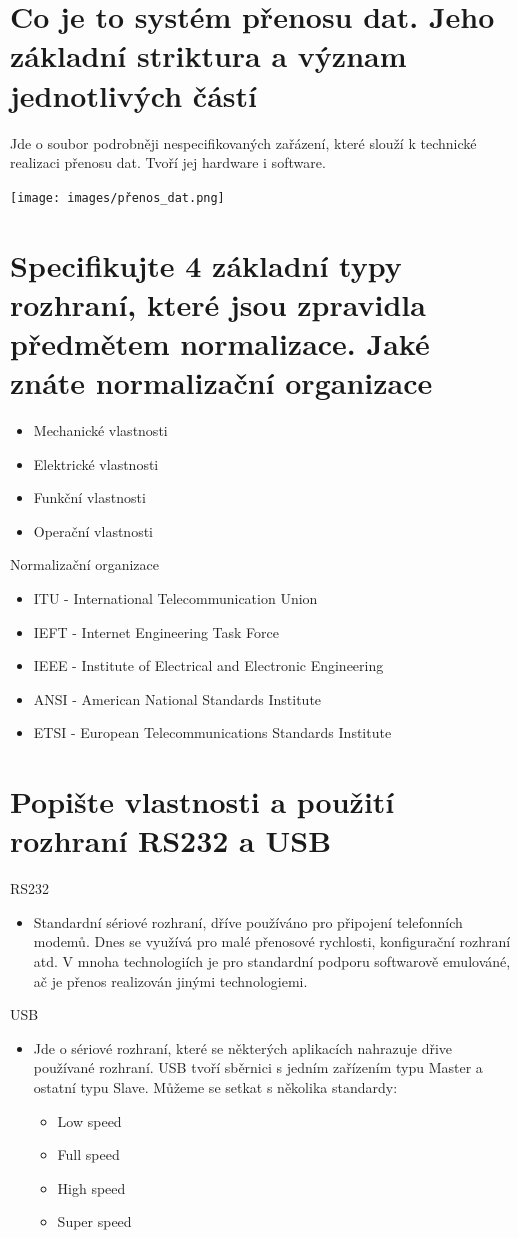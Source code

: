 \section{Co je to systém přenosu dat. Jeho základní striktura a význam jednotlivých částí}
Jde o soubor podrobněji nespecifikovaných zařázení, které slouží k technické realizaci přenosu dat.
Tvoří jej hardware i software.

\texttt{[image: images/přenos\_dat.png]}

\section{Specifikujte  4 základní typy rozhraní, které jsou zpravidla předmětem normalizace. Jaké znáte normalizační organizace}
\begin{itemize}
    \item Mechanické vlastnosti
    \item Elektrické vlastnosti
    \item Funkční vlastnosti
    \item Operační vlastnosti
\end{itemize}
Normalizační organizace
\begin{itemize}
    \item ITU - International Telecommunication Union
     \item IEFT - Internet Engineering Task Force
     \item IEEE - Institute of Electrical and Electronic Engineering
     \item ANSI - American National Standards Institute
     \item ETSI - European Telecommunications Standards Institute
\end{itemize}

\section{Popište vlastnosti a použití rozhraní RS232 a USB}
RS232
\begin{itemize}
    \item Standardní sériové rozhraní, dříve používáno pro připojení telefonních modemů.
    Dnes se využívá pro malé přenosové rychlosti, konfigurační rozhraní atd.
    V mnoha technologiích je pro standardní podporu softwarově emulováné, ač je přenos realizován jinými technologiemi.
\end{itemize}
USB
\begin{itemize}
    \item Jde o sériové rozhraní, které se některých aplikacích nahrazuje dřive používané rozhraní.
    USB tvoří sběrnici s jedním zařízením typu Master a ostatní typu Slave.
    Můžeme se setkat s několika standardy:
\begin{itemize}
    \item Low speed
    \item Full speed
    \item High speed
    \item Super speed
\end{itemize}
\end{itemize}
